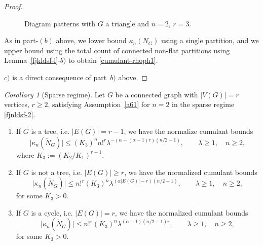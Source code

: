 \documentclass[bj,authoryear,noshowframe]{imsart}
\theoremstyle{plain}
\theoremstyle{remark}
\newtheorem{corollary}[prop]{Corollary}
\begin{document}
\begin{proof}
\begin{figure}[H]
{\begin{tikzpicture}[scale=0.9]
\end{tikzpicture}}
\caption{Diagram patterns with $G$ a triangle and $n=2$, $r=3$.}
\label{fig:diagram3-23}
\end{figure}

\vskip-0.3cm

\noindent
 As in part-$(b)$ above, we lower
 bound $\kappa_n(N_G)$ using a single partition,
 and we upper bound using the total count of
 connected non-flat partitions using Lemma~\ref{fjkldsf-l}-$b)$
 to obtain \eqref{cumulant-rhoph1}.
 
\noindent
   $c)$ is a direct consequence of part~$b)$ above.
\end{proof}

\begin{corollary}[Sparse regime] 
\label{th6.4-c}
  Let $G$ be a connected graph with $|V(G)|=r$ vertices, $r\geq 2$,
  satisfying Assumption~\ref{a61} for $n=2$ in the sparse regime \eqref{fjnldsf-2}. 
  \begin{enumerate}%
  \item 
    If $G$ is a tree, i.e. $|E(G)| = r-1$, we have the normalize
    cumulant bounds %
 \begin{equation}
   \label{jfkla} 
   \big|\kappa_n(\widetilde{N}_G)\big|
  \leq 
   (K_3)^n 
 n!^r
      \lambda^{
       - (
\alpha       -(\alpha - 1)r 
       ) ( n/2-1 ) },
   \qquad \lambda \geq 1,
   \quad n \geq 2, 
\end{equation} 
 where $K_3:=(K_2/K_1)^{r-1}$.
\item
 If $G$ is not a tree, i.e. $|E(G)|\geq r$,
 we have the normalized cumulant bounds %
 \begin{equation}
   \label{fjklds34} 
    \big|\kappa_n(\widetilde{N}_G)\big|
  \leq 
    n!^r
    (K_3)^n
        \lambda^{(\alpha |E(G)|-r)(n/2-1)}  , 
   \qquad \lambda \geq 1,
  \quad n \geq 2, 
\end{equation} 
 for some $K_3 > 0$. 
\item
  If $G$ is a cycle, i.e. $|E(G)| = r$,
  we have the normalized cumulant bounds %
 \begin{equation}
   \label{fjklds34-2} 
    \big|\kappa_n(\widetilde{N}_G)\big|
  \leq 
  n!^r
  (K_3)^n
    \lambda^{ (\alpha -1 )(n/2-1)r}, 
     \qquad \lambda \geq 1,
 \quad n \geq 2, 
\end{equation} 
 for some $K_3>0$.
  \end{enumerate}
\end{corollary}
\end{document}
